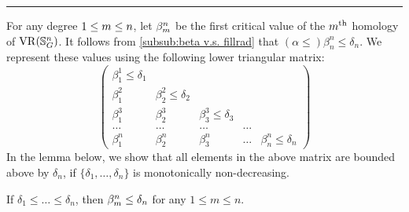 \noindent\rule{\textwidth}{0.4pt}

For any degree $1 \leq m \leq n$, let $\beta_{m}^{n}$ be the first critical value of the $m^{\mathrm{th}}$ homology of $\operatorname{VR}(\mathbb{S}^n_G)$.
It follows from \cref{subsub:beta v.s. fillrad} that $(\alpha \leq) \beta_{n}^{n} \leq \delta_n$.
We represent these values using the following lower triangular matrix:
\[
\begin{pmatrix}
	\beta_{1}^{1}\leq \delta_1 & & &&\\
	\beta_1^2 & \beta_{2}^{2} \leq \delta_2 & &&\\
	\beta_1^3 & \beta_{2}^{3} & \beta_{3}^{3} \leq \delta_3 &&\\
	\dots & \dots & \dots & \dots &\\
	\beta_1^n & \beta_2^n & \beta_3^n & \dots & \beta_n^n \leq \delta_n
\end{pmatrix}
\]
In the lemma below, we show that all elements in the above matrix are bounded above by $\delta_n$, if $\{\delta_1, \dots, \delta_n\}$ is monotonically non-decreasing.

\medskip\lemma
If $\delta_1 \leq \dots \leq \delta_n$, then $\beta_{m}^{n} \leq \delta_n$ for any $1 \leq m \leq n$.

